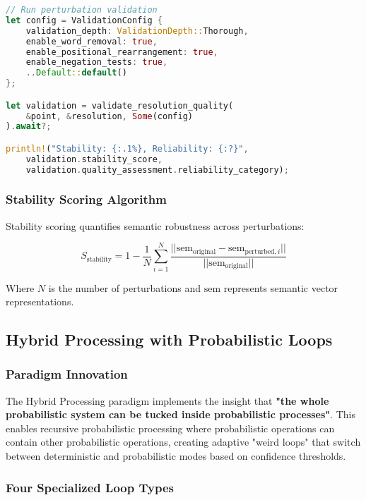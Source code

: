 \documentclass[12pt,a4paper,twoside]{article}
\begin{document}
\begin{itemize}
\begin{lstlisting}[language=rust,caption=Perturbation Validation Framework]
// Run perturbation validation
let config = ValidationConfig {
    validation_depth: ValidationDepth::Thorough,
    enable_word_removal: true,
    enable_positional_rearrangement: true,
    enable_negation_tests: true,
    ..Default::default()
};

let validation = validate_resolution_quality(
    &point, &resolution, Some(config)
).await?;

println!("Stability: {:.1%}, Reliability: {:?}",
    validation.stability_score,
    validation.quality_assessment.reliability_category);
\end{lstlisting}

\subsubsection{Stability Scoring Algorithm}

Stability scoring quantifies semantic robustness across perturbations:

\begin{equation}
S_{\text{stability}} = 1 - \frac{1}{N} \sum_{i=1}^{N} \frac{||\text{sem}_{\text{original}} - \text{sem}_{\text{perturbed},i}||}{||\text{sem}_{\text{original}}||}
\end{equation}

Where $N$ is the number of perturbations and $\text{sem}$ represents semantic vector representations.

\subsection{Hybrid Processing with Probabilistic Loops}

\subsubsection{Paradigm Innovation}

The Hybrid Processing paradigm implements the insight that \textbf{"the whole probabilistic system can be tucked inside probabilistic processes"}. This enables recursive probabilistic processing where probabilistic operations can contain other probabilistic operations, creating adaptive "weird loops" that switch between deterministic and probabilistic modes based on confidence thresholds.

\subsubsection{Four Specialized Loop Types}


\end{itemize}
\end{document}
